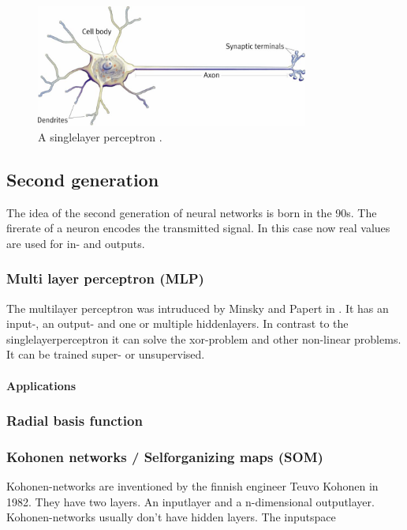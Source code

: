 \documentclass[10pt,a4paper,DIV=11]{scrreprt}
\begin{document}
\begin{center}
	\begin{figure}[H]
		\centering
		\includegraphics[width=0.8\textwidth,scale=1]{files/neuron.jpg}  
		\caption{A singlelayer perceptron \cite{PERSIN}.}
		\label{fig:neuron}
	\end{figure}
\end{center}

\subsection{Second generation}
The idea of the second generation of neural networks is born in the 90s. The firerate of a neuron encodes the transmitted signal. In this case now real values are used for in- and outputs.

\subsubsection{Multi layer perceptron (MLP)} \label{sec:mlp}
The multilayer perceptron was intruduced by Minsky and Papert in . It has an input-, an output- and
one or multiple hiddenlayers. In contrast to the singlelayerperceptron it can solve the xor-problem and other non-linear problems. It can be trained super- or unsupervised.

\paragraph{Applications}

\subsubsection{Radial basis function} %


\subsubsection{Kohonen networks / Selforganizing maps (SOM)}
Kohonen-networks are inventioned by the finnish engineer Teuvo Kohonen in 1982. They have two layers. An inputlayer and a n-dimensional outputlayer.
Kohonen-networks usually don't have hidden layers.
The inputspace 
\end{document}
